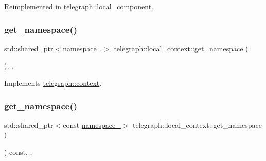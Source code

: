 Reimplemented in \hyperlink{classtelegraph_1_1local__component_abbeb3b12dc95e19e1a2972e9a374fd33}{telegraph\+::local\+\_\+component}.

\mbox{\label{classtelegraph_1_1local__context_a71a19090a93c3193615e61940fba918a}} 
\subsubsection{\texorpdfstring{get\+\_\+namespace()}{get\_namespace()}\hspace{0.1cm}{\footnotesize\ttfamily [1/2]}}
{\footnotesize\ttfamily std\+::shared\+\_\+ptr$<$\hyperlink{classtelegraph_1_1namespace__}{namespace\+\_\+}$>$ telegraph\+::local\+\_\+context\+::get\+\_\+namespace (\begin{DoxyParamCaption}{ }\end{DoxyParamCaption})\hspace{0.3cm}{\ttfamily [inline]}, {\ttfamily [override]}, {\ttfamily [virtual]}}



Implements \hyperlink{classtelegraph_1_1context_a84d92cca54be9c4e885e2673480e45a1}{telegraph\+::context}.

\mbox{\label{classtelegraph_1_1local__context_aba1ff115df4b54bae75ea41580ba32b5}} 
\subsubsection{\texorpdfstring{get\+\_\+namespace()}{get\_namespace()}\hspace{0.1cm}{\footnotesize\ttfamily [2/2]}}
{\footnotesize\ttfamily std\+::shared\+\_\+ptr$<$const \hyperlink{classtelegraph_1_1namespace__}{namespace\+\_\+}$>$ telegraph\+::local\+\_\+context\+::get\+\_\+namespace (\begin{DoxyParamCaption}{ }\end{DoxyParamCaption}) const\hspace{0.3cm}{\ttfamily [inline]}, {\ttfamily [override]}, {\ttfamily [virtual]}}



